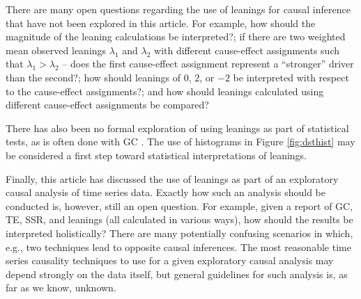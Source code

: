 \documentclass[twocolumn,aps,pre,groupedaddress]{revtex4-1}
\begin{document}
There are many open questions regarding the use of leanings for causal inference that have not been explored in this article.  For example, how should the magnitude of the leaning calculations be interpreted?; if there are two weighted mean observed leanings $\lambda_1$ and $\lambda_2$ with different cause-effect assignments such that $\lambda_1 > \lambda_2$ -- does the first cause-effect assignment represent a ``stronger'' driver than the second?; how should leanings of $0$, $2$, or $-2$ be interpreted with respect to the cause-effect assignments?; and how should leanings calculated using different cause-effect assignments be compared?

There has also been no formal exploration of using leanings as part of statistical tests, as is often done with GC \cite{Pierce1977}.  The use of histograms in Figure \ref{fig:dsthist} may be considered a first step toward statistical interpretations of leanings.

Finally, this article has discussed the use of leanings as part of an exploratory causal analysis of time series data.  Exactly how such an analysis should be conducted is, however, still an open question.  For example, given a report of GC, TE, SSR, and leanings (all calculated in various ways), how should the results be interpreted holistically?  There are many potentially confusing scenarios in which, e.g., two techniques lead to opposite causal inferences.  The most reasonable time series causality techniques to use for a given exploratory causal analysis may depend strongly on the data itself, but general guidelines for such analysis is, as far as we know, unknown.



\end{document}
